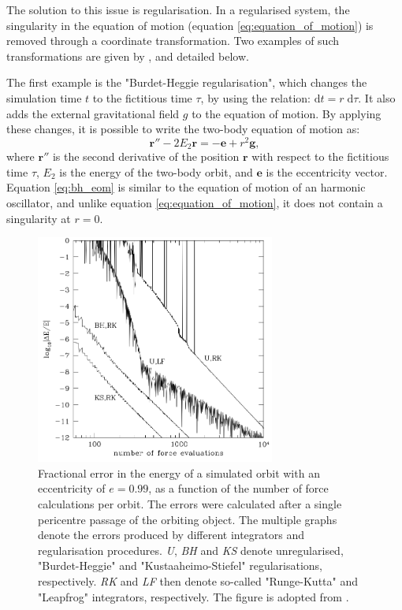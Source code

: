 \documentclass[english, twoside]{HYgradu}
\begin{document}
The solution to this issue is regularisation. In a regularised system, the singularity in the equation of motion (equation \ref{eq:equation_of_motion}) is removed through a coordinate transformation. Two examples of such transformations are given by \cite{BinneyTremaine}, and detailed below.

The first example is the "Burdet-Heggie regularisation", which changes the simulation time $t$ to the fictitious time $\tau$, by using the relation: $\mathrm{d}t = r \; \mathrm{d}\tau$. It also adds the external gravitational field $g$ to the equation of motion. By applying these changes, it is possible to write the two-body equation of motion as:
\begin{equation}
\mathbf{r}'' - 2E_2\mathbf{r} = - \mathbf{e}+r^2\mathbf{g}, \label{eq:bh_eom}
\end{equation}
where $\mathbf{r}''$ is the second derivative of the position $\mathbf{r}$ with respect to the fictitious time $\tau$, $E_2$ is the energy of the two-body orbit, and $\mathbf{e}$ is the eccentricity vector. Equation \ref{eq:bh_eom} is similar to the equation of motion of an harmonic oscillator, and unlike equation \ref{eq:equation_of_motion}, it does not contain a singularity at $r=0$.

\begin{figure}
	\centering
	\includegraphics[width=0.7\textwidth]{binneytremaine_pic.png}
	\caption{Fractional error in the energy of a simulated orbit with an eccentricity of $e=0.99$, as a function of the number of force calculations per orbit. The errors were calculated after a single pericentre passage of the orbiting object. The multiple graphs denote the errors produced by different integrators and regularisation procedures. \textit{U}, \textit{BH} and \textit{KS} denote unregularised, "Burdet-Heggie" and "Kustaaheimo-Stiefel" regularisations, respectively. \textit{RK} and \textit{LF} then denote so-called "Runge-Kutta" and "Leapfrog" integrators, respectively. The figure is adopted from \cite{BinneyTremaine}.}
	\label{figure:regularized}
\end{figure}
\end{document}
